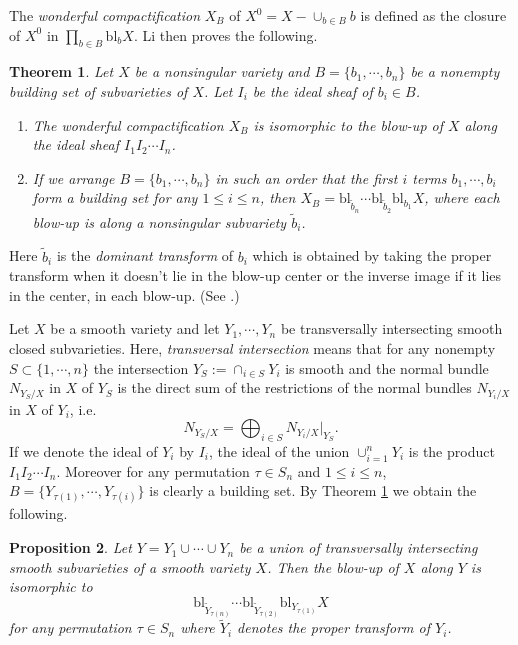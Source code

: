 \documentclass[10pt]{amsart}
\newtheorem{theorem}{Theorem}[section]
\newtheorem{proposition}[theorem]{Proposition}
\theoremstyle{definition}
\begin{document}
The \emph{wonderful compactification} $X_B$ of $X^0=X-\cup_{b\in
B} b$ is defined as the closure of $X^0$ in $\prod_{b\in
B}\mathrm{bl}_bX$. Li then proves the following.
\begin{theorem}\cite[Theorem 1.3]{Li} \label{thm-Li1}
Let $X$ be a nonsingular variety and $B = \{b_1, \cdots,b_n\}$ be
a nonempty building set of subvarieties of $X$. Let $I_i$ be the
ideal sheaf of $b_i \in B$. \begin{enumerate}\item The wonderful
compactification $X_B$ is isomorphic to the blow-up of $X$ along
the ideal sheaf $I_1I_2\cdots I_n$. \item If we arrange $B =
\{b_1, \cdots,b_n\}$ in such an order that the first $i$ terms
$b_1,\cdots,b_i$ form a building set for any $1\le i\le n$, then
$X_B = \mathrm{bl}_{\tilde{b}_n} \cdots \mathrm{bl}_{\tilde{b}_2}
\mathrm{bl}_{b_1} X$, where each blow-up is along a nonsingular
subvariety $\tilde{b}_i$.\end{enumerate}
\end{theorem}
Here $\tilde{b}_i$ is the \emph{dominant transform} of $b_i$ which
is obtained by taking the proper transform when it doesn't lie in
the blow-up center or the inverse image if it lies in the center,
in each blow-up. (See \cite[Definition 2.7]{Li}.)


Let $X$ be a smooth variety and let $Y_1, \cdots, Y_n$ be
transversally intersecting smooth closed subvarieties. Here,
\emph{transversal intersection} means that for any nonempty $S
\subset \{1, \cdots, n\}$ the intersection $Y_S:=\cap_{i \in
S}Y_i$ is smooth and the normal bundle $N_{Y_S/X}$ in $X$ of $Y_S$
is the direct sum of the restrictions of the normal bundles
$N_{Y_i/X}$ in $X$ of $Y_i$, i.e.
$$N_{Y_S/X} = \bigoplus_{i\in S} N_{Y_i/X}|_{Y_S}.$$
If we denote the ideal of $Y_i$ by $I_i$, the ideal of the union
$\cup_{i=1}^n Y_i$ is the product $I_1I_2\cdots I_n$. Moreover for
any permutation $\tau\in S_n$ and $1\le i\le n$,
$B=\{Y_{\tau(1)},\cdots,Y_{\tau(i)}\}$ is clearly a building set.
By Theorem \ref{thm-Li1} we obtain the following.
\begin{proposition}\label{prop-bltrcen}
Let $Y=Y_1\cup\cdots \cup Y_n$ be a union of transversally
intersecting smooth subvarieties of a smooth variety $X$. Then the
blow-up of $X$ along $Y$ is isomorphic to
\[
\mathrm{bl}_{\tilde Y_{\tau(n)}}\cdots \mathrm{bl}_{\tilde
Y_{\tau(2)}}\mathrm{bl}_{Y_{\tau(1)}} X
\]
for any permutation $\tau\in S_n$ where $\tilde{Y}_i$ denotes the
proper transform of $Y_i$.
\end{proposition}
\end{document}
